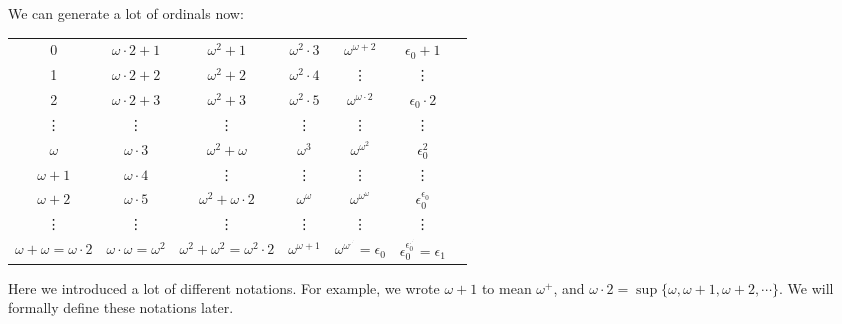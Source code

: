 \documentclass[a4paper]{article}
\begin{document}
We can generate a lot of ordinals now:
\begin{center}
  \begin{tabular}{ccccccc}
    0                                 & $\omega\cdot 2 + 1$             & $\omega^2 + 1$                           & $\omega^2\cdot 3$     & $\omega^{\omega + 2}$                    & $\epsilon_0 + 1$                                 \\
    1                                 & $\omega\cdot 2 + 2$             & $\omega^2 + 2$                           & $\omega^2\cdot 4$     & \vdots                                   & \vdots                                           \\
    2                                 & $\omega\cdot 2 + 3$             & $\omega^2 + 3$                           & $\omega^2\cdot 5$     & $\omega^{\omega \cdot 2}$                & $\epsilon_0 \cdot 2$                             \\
    \vdots                            & \vdots                          & \vdots                                   & \vdots                & \vdots                                   & \vdots                                           \\
    $\omega$                          & $\omega\cdot 3$                 & $\omega^2 + \omega$                      & $\omega^3$            & $\omega^{\omega^2}$                      & $\epsilon_0^2$                                   \\
    $\omega + 1$                      & $\omega\cdot 4$                 & \vdots                                   & \vdots                & \vdots                                   & \vdots                                           \\
    $\omega + 2$                      & $\omega\cdot 5$                 & $\omega^2 + \omega \cdot 2$              & $\omega^\omega$       & $\omega^{\omega^{\omega}}$               & $\epsilon_0^{\epsilon_0}$                        \\
    \vdots                            & \vdots                          & \vdots                                   & \vdots                & \vdots                                   & \vdots                                           \\
    $\omega + \omega = \omega\cdot 2$ & $\omega\cdot \omega = \omega^2$ & $\omega^2 + \omega^2 = \omega^2 \cdot 2$ & $\omega^{\omega + 1}$ & $\omega^{\omega^{.^{.^.}}} = \epsilon_0$ & $\epsilon_0^{\epsilon_0^{.^{.^.}}} = \epsilon_1$ \\
  \end{tabular}
\end{center}
Here we introduced a lot of different notations. For example, we wrote $\omega + 1$ to mean $\omega^+$, and $\omega\cdot 2 = \sup\{\omega, \omega + 1, \omega + 2, \cdots\}$. We will formally define these notations later.
\end{document}

